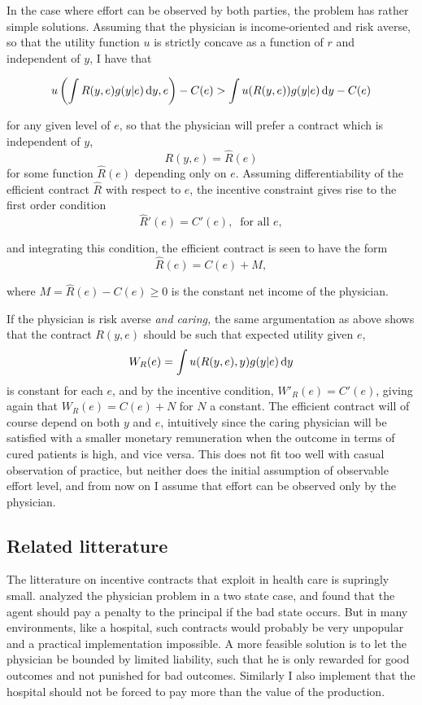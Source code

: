 In the case where effort can be observed by both parties, the problem has rather simple solutions. Assuming that the physician is income-oriented and risk averse, so that the utility function $u$ is strictly concave as a function of $r$ and independent of $y$, I have that

 \[
     u\left(\int R(y,e)g(y|e)\dif y,e\right)-C(e)>\int u(R(y,e))g(y|e)\dif y-C(e)
 \]

for any given level of $e$, so that the physician will prefer a contract which is independent of $y$,
\[
    R(y,e)=\hat{R}(e)
\]
for some function $\hat{R}(e)$ depending only on $e$. Assuming differentiability of the efficient contract $\hat{R}$ with respect to $e$, the incentive constraint
gives rise to the first order condition
\[
    \hat{R}'(e)= C'(e),\ \text{ for all } e,
\]

and  integrating this condition, the efficient contract is seen to have the form
\[
    \hat{R}(e)=C(e)+M,
\]

where $M=\hat{R}(e)-C(e)\geq 0$ is the constant net income of the physician.

If the physician is risk averse \emph{and caring,} the same argumentation as above shows that the contract $R(y,e)$ should be such that expected utility given $e$, 
 \[
     W_R(e)=\int u(R(y,e),y)g(y|e)\dif y
 \]
is constant for each $e$, and by the incentive condition,
$W'_R(e)=C'(e)$, giving again that $W_R(e)=C(e)+N$ for $N$ a constant. The efficient contract will of course depend on both $y$ and $e$, intuitively since the caring physician will be satisfied with a smaller monetary remuneration when the outcome in terms of cured patients is high, and vice versa. This does not fit too well with casual observation of practice, but neither does the initial assumption of observable effort level, and from now on I assume that effort can be observed only by the physician.


\subsection{Related litterature} %
\label{sub:related_litterature}
The litterature on incentive contracts that exploit in health care is supringly small. \textcite{Lambert2005No} analyzed the physician problem in a two state case, and found that the agent should pay a penalty to the principal if the bad state occurs. But in many environments, like a hospital, such contracts would probably be very unpopular and a practical implementation impossible. A more feasible solution is to let the physician be bounded by limited liability, such that he is only rewarded for good outcomes and not punished for bad outcomes. Similarly I also implement that the hospital should not be forced to pay more than the value of the production.  

